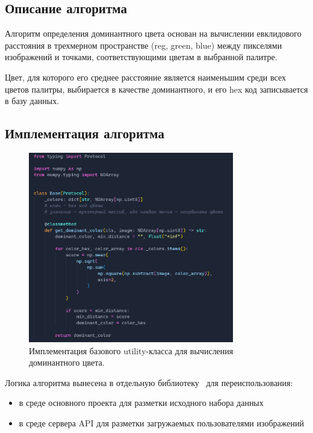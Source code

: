 \documentclass[a4paper,12pt]{extarticle}
\begin{document}
\newpage
\subsection{Описание алгоритма}

Алгоритм определения доминантного цвета основан на вычислении евклидового расстояния в трехмерном
пространстве (reg, green, blue) между пикселями изображений и точками, соответствующими цветам в
выбранной палитре.\par

Цвет, для которого его среднее расстояние является наименьшим среди всех цветов палитры, выбирается
в качестве доминантного, и его hex код записывается в базу данных.

\subsection{Имплементация алгоритма}

\begin{figure}[ht]
	\centering
	\includegraphics[width=0.8\textwidth]{color_utils.png}
	\caption{Имплементация базового utility-класса для вычисления доминантного цвета.}
	\label{fig:color_utils}
\end{figure}

Логика алгоритма вынесена в отдельную библиотеку~\cite{color_utils} для переиспользования:

\begin{itemize}
	\item в среде основного проекта для разметки исходного набора данных
	\item в среде сервера API для разметки загружаемых пользователями изображений
\end{itemize}
\end{document}
